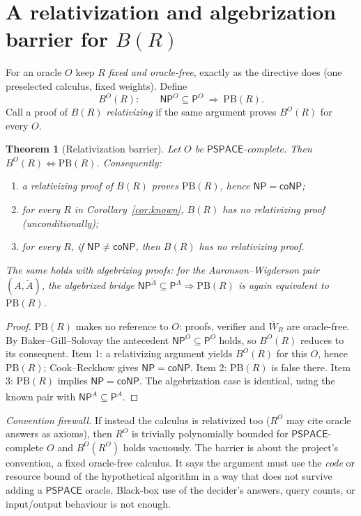 \documentclass[11pt]{article}
\newtheorem{theorem}{Theorem}
\theoremstyle{definition}
\newcommand{\Pclass}{\mathsf{P}}
\newcommand{\NP}{\mathsf{NP}}
\newcommand{\coNP}{\mathsf{coNP}}
\newcommand{\PSPACE}{\mathsf{PSPACE}}
\newcommand{\Wb}{\overline W}
\newcommand{\PB}{\mathrm{PB}}
\begin{document}
\section{A relativization and algebrization barrier for $B(R)$}\label{sec:relativ}
For an oracle $O$ keep $R$ \emph{fixed and oracle-free}, exactly as the
directive does (one preselected calculus, fixed weights). Define
\[
B^O(R):\qquad \NP^O\subseteq\Pclass^O\ \Longrightarrow\ \PB(R).
\]
Call a proof of $B(R)$ \emph{relativizing} if the same argument proves
$B^O(R)$ for every $O$.

\begin{theorem}[Relativization barrier]\label{thm:relativ}
Let $O$ be $\PSPACE$-complete. Then $B^O(R)\iff\PB(R)$. Consequently:
\begin{enumerate}
\item a relativizing proof of $B(R)$ proves $\PB(R)$, hence $\NP=\coNP$;
\item for every $R$ in Corollary~\ref{cor:known}, $B(R)$ has no relativizing
proof (unconditionally);
\item for every $R$, if $\NP\neq\coNP$, then $B(R)$ has no relativizing proof.
\end{enumerate}
The same holds with algebrizing proofs: for the Aaronson--Wigderson pair
$(A,\tilde A)$, the algebrized bridge
$\NP^{\tilde A}\subseteq\Pclass^{A}\Rightarrow\PB(R)$ is again equivalent to
$\PB(R)$.
\end{theorem}
\begin{proof}
$\PB(R)$ makes no reference to $O$: proofs, verifier and $\Wb_R$ are
oracle-free. By Baker--Gill--Solovay the antecedent $\NP^O\subseteq\Pclass^O$
holds, so $B^O(R)$ reduces to its consequent. Item 1: a relativizing argument
yields $B^O(R)$ for this $O$, hence $\PB(R)$; Cook--Reckhow gives $\NP=\coNP$.
Item 2: $\PB(R)$ is false there. Item 3: $\PB(R)$ implies $\NP=\coNP$. The
algebrization case is identical, using the known pair with
$\NP^{\tilde A}\subseteq\Pclass^A$.
\end{proof}

\textit{Convention firewall.} If instead the calculus is relativized too
($R^O$ may cite oracle answers as axioms), then $R^O$ is trivially polynomially
bounded for $\PSPACE$-complete $O$ and $B^O(R^O)$ holds vacuously. The barrier
is about the project's convention, a fixed oracle-free calculus. It
says the argument must use the \emph{code} or resource bound of the hypothetical
algorithm in a way that does not survive adding a $\PSPACE$ oracle. Black-box
use of the decider's answers, query counts, or input/output behaviour is not
enough.
\end{document}
